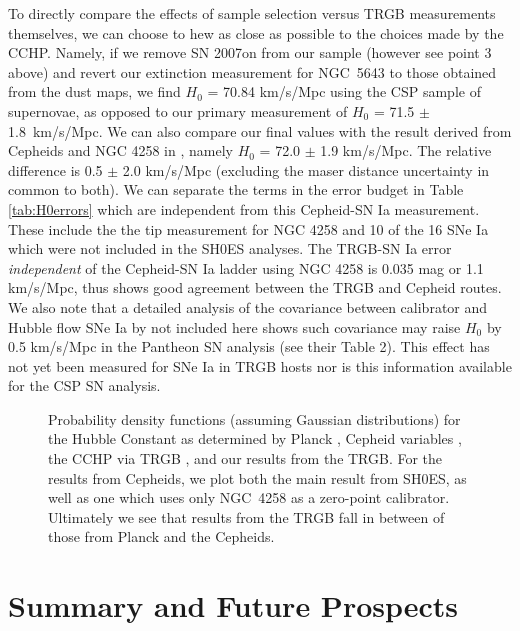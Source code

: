 \documentclass[twocolumn]{aastex62}
\newcommand{\hubblePan}{71.5 $\pm$ 1.8~km/s/Mpc}
\begin{document}
To directly compare the effects of sample selection versus TRGB measurements themselves, we can choose to hew as close as possible to the choices made by the CCHP. Namely, if we remove SN 2007on from our sample (however see point 3 above) and revert our extinction measurement for NGC~5643 to those obtained from the dust maps, we find $H_{0}$ = 70.84 km/s/Mpc using the CSP sample of supernovae, as opposed to our primary measurement of $H_0$ = \hubblePan. We can also compare our final values with the result derived from Cepheids and NGC 4258 in \cite{2019ApJ...886L..27R}, namely $H_{0}$ = 72.0 $\pm$ 1.9 km/s/Mpc. The relative difference is 0.5 $\pm$ 2.0 km/s/Mpc (excluding the maser distance uncertainty in common to both). We can separate the terms in the error budget in Table \ref{tab:H0errors} which are independent from this Cepheid-SN Ia measurement. These include the the tip measurement for NGC 4258 and 10 of the 16 SNe Ia which were not included in the SH0ES analyses. The TRGB-SN Ia error {\it independent} of the Cepheid-SN Ia ladder using NGC 4258 is 0.035 mag or 1.1 km/s/Mpc, thus shows good agreement between the TRGB and Cepheid routes. We also note that a detailed analysis of the covariance between calibrator and Hubble flow SNe Ia by \cite{2020ApJ...894...54D} not included here shows such covariance may raise $H_0$ by 0.5 km/s/Mpc in the Pantheon SN analysis (see their Table 2). This effect has not yet been measured for SNe Ia in TRGB hosts nor is this information available for the CSP SN analysis.

\begin{figure}
\caption{Probability density functions (assuming Gaussian distributions) for the Hubble Constant as determined by Planck \citep{2020A&A...641A...6P}, Cepheid variables \citep{2021arXiv211204510R}, the CCHP via TRGB \citep{2021arXiv210615656F}, and our results from the TRGB. For the results from Cepheids, we plot both the main result from SH0ES, as well as one which uses only NGC~4258 as a zero-point calibrator. Ultimately we see that results from the TRGB fall in between of those from Planck and the Cepheids.}
\label{summaryH0}
\end{figure}

\section{Summary and Future Prospects}
\end{document}
